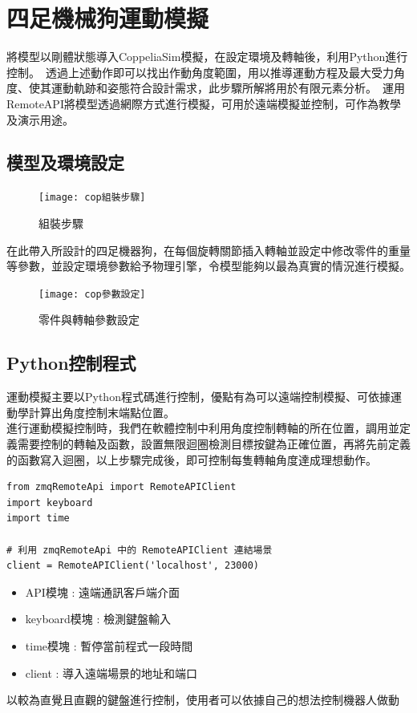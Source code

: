 \chapter{四足機械狗運動模擬}
將模型以剛體狀態導入CoppeliaSim模擬，在設定環境及轉軸後，利用Python進行控制。\
透過上述動作即可以找出作動角度範圍，用以推導運動方程及最大受力角度、使其運動軌跡和姿態符合設計需求，此步驟所解將用於有限元素分析。\
運用RemoteAPI將模型透過網際方式進行模擬，可用於遠端模擬並控制，可作為教學及演示用途。\\

\section{模型及環境設定}
\begin{figure}[hbt!]
\center
\texttt{[image: cop組裝步驟]}
\caption{\Large 組裝步驟}\label{cop組裝步驟}
\end{figure}
\newpage
在此帶入所設計的四足機器狗，在每個旋轉關節插入轉軸並設定中修改零件的重量等參數，並設定環境參數給予物理引擎，令模型能夠以最為真實的情況進行模擬。\\

\begin{figure}[hbt!]
\center
\texttt{[image: cop參數設定]}
\caption{\Large 零件與轉軸參數設定}\label{cop參數設定}
\end{figure}
\newpage

\section{Python控制程式}
運動模擬主要以Python程式碼進行控制，優點有為可以遠端控制模擬、可依據運動學計算出角度控制末端點位置。\\

進行運動模擬控制時，我們在軟體控制中利用角度控制轉軸的所在位置，調用並定義需要控制的轉軸及函數，設置無限迴圈檢測目標按鍵為正確位置，再將先前定義的函數寫入迴圈，以上步驟完成後，即可控制每隻轉軸角度達成理想動作。\\


\label{模塊導入}
\begin{lstlisting}[caption=\Large 模塊導入]
from zmqRemoteApi import RemoteAPIClient 
import keyboard
import time

# 利用 zmqRemoteApi 中的 RemoteAPIClient 連結場景
client = RemoteAPIClient('localhost', 23000)
\end{lstlisting}

\begin{itemize}
\item API模塊 : 遠端通訊客戶端介面
\item keyboard模塊 : 檢測鍵盤輸入
\item time模塊 : 暫停當前程式一段時間
\item client : 導入遠端場景的地址和端口
\end{itemize}
以較為直覺且直觀的鍵盤進行控制，使用者可以依據自己的想法控制機器人做動\\

